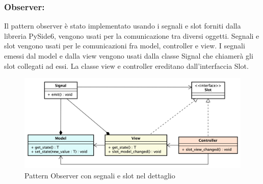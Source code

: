 \subsubsection{Observer:}
Il pattern observer è stato implementato usando i segnali e slot forniti dalla libreria PySide6, vengono usati per la comunicazione tra diversi oggetti.
Segnali e slot vengono usati per le comunicazioni fra model, controller e view. I segnali emessi dal model e dalla view vengono usati dalla classe Signal che chiamerà gli slot collegati ad essi. La classe view e controller ereditano dall'interfaccia Slot.
\begin{figure}[H]
    \centering
    \includegraphics[scale = 0.38]{components/img/observer-implementazione.png}
    \caption{Pattern Observer con segnali e slot nel dettaglio}
    \label{fig:Pattern observer con segnali e slot}
\end{figure}

